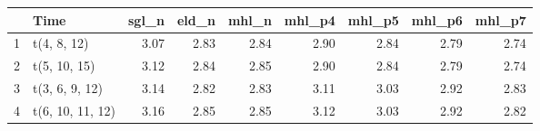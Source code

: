 \begin{table}[ht]
\centering
\begin{tabular}{rlrrrrrrr}
  \hline
 & Time & sgl\_n & eld\_n & mhl\_n & mhl\_p4 & mhl\_p5 & mhl\_p6 & mhl\_p7 \\ 
  \hline
  1 & t(4, 8, 12) & 3.07 & 2.83 & 2.84 & 2.90 & 2.84 & 2.79 & 2.74 \\ 
  2 & t(5, 10, 15) & 3.12 & 2.84 & 2.85 & 2.90 & 2.84 & 2.79 & 2.74 \\ 
  3 & t(3, 6, 9, 12) & 3.14 & 2.82 & 2.83 & 3.11 & 3.03 & 2.92 & 2.83 \\ 
  4 & t(6, 10, 11, 12) & 3.16 & 2.85 & 2.85 & 3.12 & 3.03 & 2.92 & 2.82 \\ 
   \hline
\end{tabular}
\end{table}
